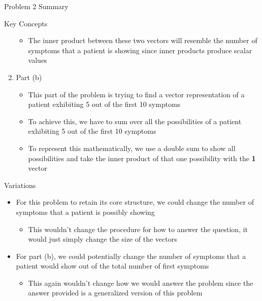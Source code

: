 \begin{summary}{Problem 2 Summary}
\begin{statement}{Key Concepts}
\begin{enumerate}[label = (\alph*)]
\begin{itemize}
                \item The inner product between these two vectors will resemble the number of symptoms that a patient is showing since inner products produce scalar values
            \end{itemize}
            \item Part (b)
            \begin{itemize}
                \item This part of the problem is trying to find a vector representation of a patient exhibiting 5 out of the first 10 symptoms
                \item To achieve this, we have to sum over all the possibilities of a patient exhibiting 5 out of the first 10 symptoms
                \item To represent this mathematically, we use a double sum to show all possibilities and take the inner product of that one possibility with the \textbf{1} vector
            \end{itemize}
        \end{enumerate}
    \end{statement}
    \begin{statement}{Variations}
        \begin{itemize}
            \item For this problem to retain its core structure, we could change the number of symptoms that a patient is possibly showing
            \begin{itemize}
                \item This wouldn't change the procedure for how to answer the question, it would just simply change the size of the vectors
            \end{itemize}
            \item For part (b), we could potentially change the number of symptoms that a patient would show out of the total number of first symptoms
            \begin{itemize}
                \item This again wouldn't change how we would answer the problem since the answer provided is a generalized version of this problem
            \end{itemize}
        \end{itemize}
    \end{statement}
\end{summary}

